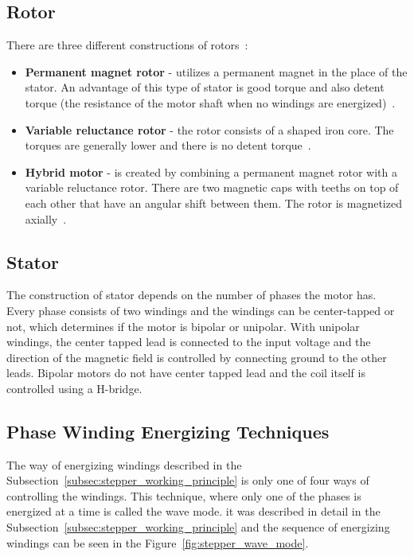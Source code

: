 \subsection{Rotor}
\label{subsec:rotor}
There are three different constructions of rotors~\cite{noauthor_stepper_nodate}:
\begin{itemize}
    \item \textbf{Permanent magnet rotor} - utilizes a permanent magnet in the place of the stator.
    An advantage of this type of stator is good torque and also detent torque (the resistance of the motor shaft when no windings are energized)~\cite{noauthor_stepper_nodate}.
    \item \textbf{Variable reluctance rotor} - the rotor consists of a shaped iron core.
    The torques are generally lower and there is no detent torque~\cite{noauthor_stepper_nodate}.
    \item \textbf{Hybrid motor} - is created by combining a permanent magnet rotor with a variable reluctance rotor.
    There are two magnetic caps with teeths on top of each other that have an angular shift between them.
    The rotor is magnetized axially~\cite{noauthor_stepper_nodate}.
\end{itemize}

\subsection{Stator}
\label{subsec:stator}
The construction of stator depends on the number of phases the motor has.
Every phase consists of two windings and the windings can be center-tapped or not, which determines if the motor is bipolar or unipolar.
With unipolar windings, the center tapped lead is connected to the input voltage and the direction of the magnetic field is controlled by connecting ground to the other leads.
Bipolar motors do not have center tapped lead and the coil itself is controlled using a H-bridge.

\subsection{Phase Winding Energizing Techniques}
\label{subsec:winding_tech}
The way of energizing windings described in the Subsection~\ref{subsec:stepper_working_principle} is only one of four ways of controlling the windings.
This technique, where only one of the phases is energized at a time is called the wave mode.
it was described in detail in the Subsection~\ref{subsec:stepper_working_principle} and the sequence of energizing windings can be seen in the Figure~\ref{fig:stepper_wave_mode}.

